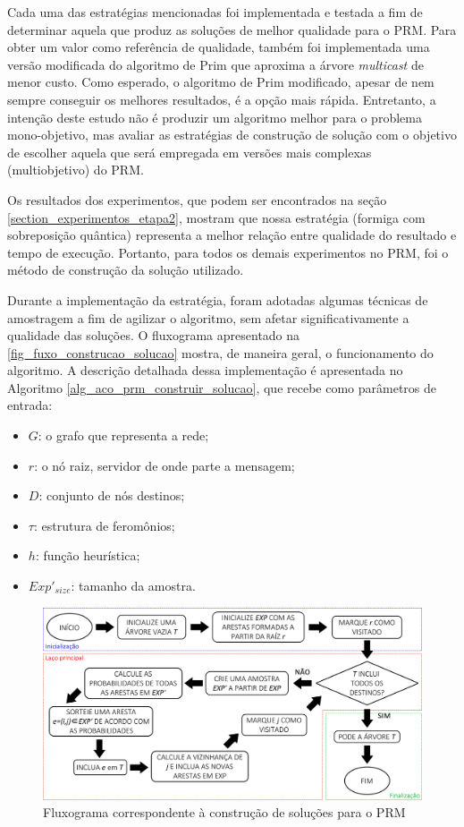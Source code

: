 Cada uma das estratégias mencionadas foi implementada e testada a fim de determinar aquela que produz as soluções de melhor qualidade para o PRM. Para obter um valor como referência de qualidade, também foi implementada uma versão modificada do algoritmo de Prim \cite{Prim1957} que aproxima a árvore \textit{multicast} de menor custo. Como esperado, o algoritmo de Prim modificado, apesar de nem sempre conseguir os melhores resultados, é a opção mais rápida. Entretanto, a intenção deste estudo não é produzir um algoritmo melhor para o problema mono-objetivo, mas avaliar as estratégias de construção de solução com o objetivo de escolher aquela que será empregada em versões mais complexas (multiobjetivo) do PRM.

Os resultados dos experimentos, que podem ser encontrados na seção \ref{section_experimentos_etapa2}, mostram que nossa estratégia (formiga com sobreposição quântica) representa a melhor relação entre qualidade do resultado e tempo de execução. Portanto, para todos os demais experimentos no PRM, foi o método de construção da solução utilizado.

Durante a implementação da estratégia, foram adotadas algumas técnicas de amostragem a fim de agilizar o algoritmo, sem afetar significativamente a qualidade das soluções. O fluxograma apresentado na \autoref{fig_fuxo_construcao_solucao} mostra, de maneira geral, o funcionamento do algoritmo. A descrição detalhada dessa implementação é apresentada no Algoritmo \ref{alg_aco_prm_construir_solucao}, que recebe como parâmetros de entrada:

\begin{itemize}
	\item $G$: o grafo que representa a rede;
	\item $r$: o nó raiz, servidor de onde parte a mensagem;
	\item $D$: conjunto de nós destinos;
	\item $\tau$: estrutura de feromônios;
	\item $h$: função heurística;
	\item $Exp'_{size}$: tamanho da amostra.
\end{itemize}

\begin{figure}[!htbp]	
	\includegraphics[width=1\textwidth]{cap_algoritmo-proposto/figs/fluxo-construcao-solucao}
	\caption{\label{fig_fuxo_construcao_solucao}Fluxograma correspondente à construção de soluções para o PRM}
\end{figure}

